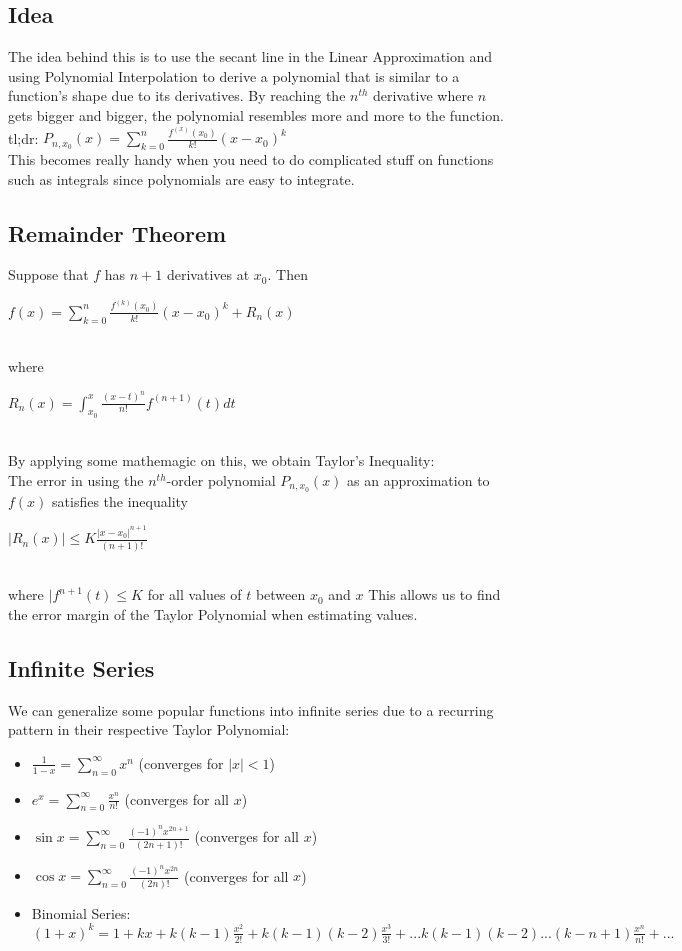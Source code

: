\documentclass[12pt]{report}
\begin{document}
		\subsection{Idea}
			The idea behind this is to use the secant line in the Linear Approximation and using Polynomial Interpolation to derive a polynomial that is similar to a function's shape due to its derivatives. By reaching the $n^{th}$ derivative where $n$ gets bigger and bigger, the polynomial resembles more and more to the function.\\
			tl;dr: $P_{n,x_0}(x) = \sum_{k=0}^{n} \frac{f^{(x)}(x_0)}{k!}(x-x_0)^k$\\
			This becomes really handy when you need to do complicated stuff on functions such as integrals since polynomials are easy to integrate.
		\subsection{Remainder Theorem}
			Suppose that $f$ has $n+1$ derivatives at $x_0$. Then \\
			\centerline{$f(x) = \sum_{k=0}^{n} \frac{f^{(k)}(x_0)}{k!}(x-x_0)^k+R_n(x)$}\\
			where\\
			\centerline{$R_n(x) = \int_{x_0}^{x} \frac{(x-t)^n}{n!} f^{(n+1)}(t)dt$}\\
			By applying some mathemagic on this, we obtain Taylor's Inequality:\\
			The error in using the $n^{th}$-order polynomial $P_{n,x_0}(x)$ as an approximation to $f(x)$ satisfies the inequality \\
			\centerline{$|R_n(x)| \leq K \frac{|x-x_0|^{n+1}}{(n+1)!}$}\\
			where $|f^{n+1}(t) \leq K$ for all values of $t$ between $x_0$ and $x$
			This allows us to find the error margin of the Taylor Polynomial when estimating values. 
		\subsection{Infinite Series}
			We can generalize some popular functions into infinite series due to a recurring pattern in their respective Taylor Polynomial:
			\begin{itemize}
				\item $\frac{1}{1-x} = \sum_{n=0}^{\infty} x^n$ (converges for $|x| < 1$)
				\item $e^x = \sum_{n=0}^{\infty} \frac{x^n}{n!}$ (converges for all $x$)
				\item $\sin x = \sum_{n=0}^{\infty} \frac{(-1)^nx^{2n+1}}{(2n+1)!}$ (converges for all $x$)
				\item $\cos x = \sum_{n=0}^{\infty} \frac{(-1)^nx^{2n}}{(2n)!}$ (converges for all $x$)
				\item Binomial Series: $(1+x)^k = 1 + kx + k(k-1)\frac{x^2}{2!} + k(k-1)(k-2)\frac{x^3}{3!} + ... k(k-1)(k-2) ... (k-n+1) \frac{x^n}{n!} + ...$
			\end{itemize}
\end{document}

